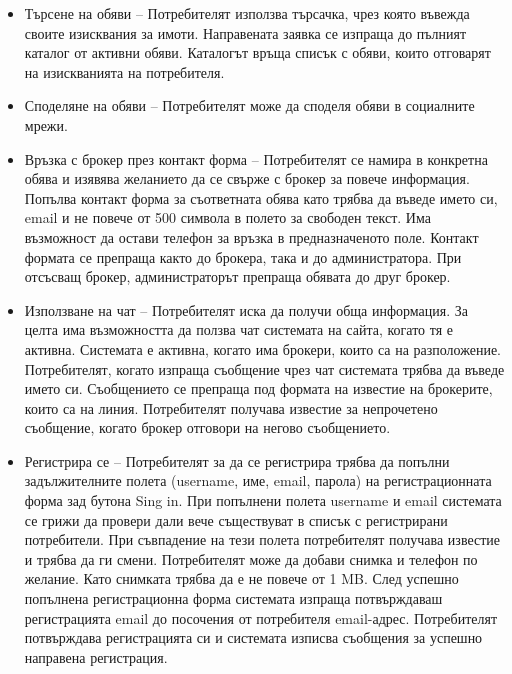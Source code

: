 \documentclass[a4paper]{article}
\begin{document}
		\begin{itemize}
		\item {Търсене на обяви – Потребителят използва търсачка, чрез която въвежда своите изисквания за имоти. Направената заявка се изпраща до пълният каталог от активни обяви. Каталогът връща списък с обяви, които отговарят на изискванията на потребителя.
}
		\item {Споделяне на обяви – Потребителят може да споделя обяви в социалните мрежи.
}

		\item {Връзка с брокер през контакт форма – Потребителят се намира в конкретна обява и изявява желанието да се свърже с брокер за повече информация. Попълва контакт форма за съответната обява като трябва да въведе името си, email и не повече от 500 символа в полето за свободен текст. Има възможност да остави телефон за връзка в предназначеното поле. Контакт формата се препраща както до брокера, така и до администратора. При отсъсващ брокер, администраторът препраща обявата до друг брокер.
}
		\item {Използване на чат – Потребителят иска да получи обща информация. За целта има възможността да ползва чат системата на сайта, когато тя е активна. Системата е активна, когато има брокери, които са на разположение. Потребителят, когато изпраща съобщение чрез чат системата трябва да въведе името си. Съобщението се препраща под формата на известие на брокерите, които са на линия. Потребителят получава известие за непрочетено съобщение, когато брокер отговори на негово съобщението.
}
		\item {Регистрира се – Потребителят за да се регистрира трябва да попълни задължителните полета (username, име, email, парола) на регистрационната форма зад бутона Sing in. При попълнени полета username и email системата се грижи да провери дали вече съществуват в списък с регистрирани потребители. При съвпадение на тези полета потребителят получава известие и трябва да ги смени. Потребителят може да добави снимка и телефон по желание. Като снимката трябва да е не повече от 1 MB. След успешно попълнена регистрационна форма системата изпраща потвърждаваш регистрацията email до посочения от потребителя email-адрес. Потребителят потвърждава регистрацията си и системата изписва съобщения за успешно направена регистрация.
}
		\end{itemize}
		
\end{document}
